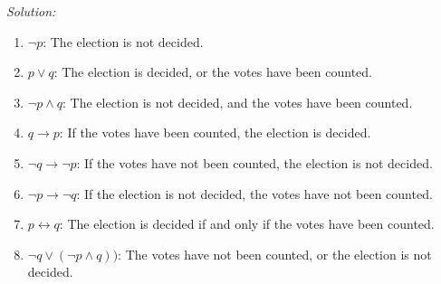 \documentclass[10pt]{article}
\renewcommand{\implies}{\rightarrow}
\renewcommand{\lor}{\vee}
\renewcommand{\land}{\wedge}
\renewcommand{\iff}{\leftrightarrow}
\begin{document}
\textit{Solution:}

\begin{enumerate}
\item $\lnot p$: The election is not decided.

\item $p \lor q$: The election is decided, or the votes have been counted.

\item $\lnot p \land q$: The election is not decided, and the votes have been counted.

\item $q \implies p$: If the votes have been counted, the election is decided.

\item $\lnot q \implies \lnot p$: If the votes have not been counted, the election is not decided.

\item $\lnot p \implies \lnot q$: If the election is not decided, the votes have not been counted.

\item $ p \iff q$: The election is decided if and only if the votes have been counted.

\item $ \lnot q \lor (\lnot p \land q))$: The votes have not been counted, or the election is not decided.

\end{enumerate}
\end{document}
